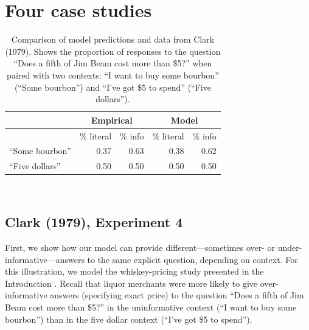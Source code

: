 \documentclass[12pt, floatsintext, jou]{apa6}
\begin{document}
\section{Four case studies}


\begin{table}[t]
\centering
\begin{tabular}{ p{3cm} | r | r ||||||  r | r }
& \multicolumn{2}{c||||||}{Empirical} & \multicolumn{2}{c}{Model} \\
\hline
&           \% literal &   \%  info &           \% literal &   \%  info    \\
\hline
``Some bourbon'' &   0.37 & 0.63 &  0.38 & 0.62 \\
\hline
``Five dollars''     & 0.50 & 0.50 & 0.50 & 0.50 \\
\end{tabular}
\\[1.5pt]
\caption{Comparison of model predictions and data from Clark (1979). Shows the proportion of responses to the question ``Does a fifth of Jim Beam cost more than \$5?'' when paired with two contexts: ``I want to buy some bourbon'' (``Some bourbon'') and ``I've got \$5 to spend'' (``Five dollars''). } 
\label{table:clark79exp4}
\end{table}

\subsection{Clark (1979), Experiment 4}
First, we show how our model can provide different---sometimes over- or under-informative---answers to the same explicit question, depending on context. For this illustration, we model the whiskey-pricing study presented in the Introduction \cite{Clark79_IndirectSpeechActs}. Recall that liquor merchants were more likely to give over-informative answers (specifying exact price) to the question ``Does a fifth of Jim Beam cost more than \$5?'' in the uninformative context (``I want to buy some bourbon'') than in the five dollar context (``I've got \$5 to spend'').
\end{document}
